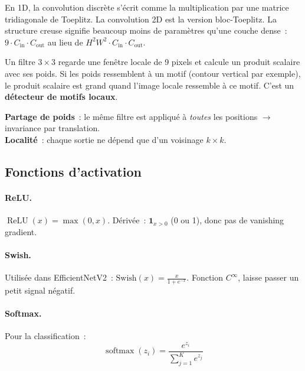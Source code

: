 \documentclass[11pt,a4paper]{article}
\DeclareMathOperator{\softmax}{softmax}
\DeclareMathOperator{\ReLU}{ReLU}
\begin{document}
\begin{rappelbox}
En 1D, la convolution discr\`ete s'\'ecrit comme la multiplication par une matrice tridiagonale de Toeplitz. La convolution 2D est la version bloc-Toeplitz. La structure creuse signifie beaucoup moins de param\`etres qu'une couche dense~: $9 \cdot C_{\text{in}} \cdot C_{\text{out}}$ au lieu de $H^2 W^2 \cdot C_{\text{in}} \cdot C_{\text{out}}$.
\end{rappelbox}

\begin{intubox}
Un filtre $3 \times 3$ regarde une fen\^etre locale de 9 pixels et calcule un produit scalaire avec ses poids. Si les poids ressemblent \`a un motif (contour vertical par exemple), le produit scalaire est grand quand l'image locale ressemble \`a ce motif. C'est un \textbf{d\'etecteur de motifs locaux}.

\textbf{Partage de poids}~: le m\^eme filtre est appliqu\'e \`a \emph{toutes} les positions $\to$ invariance par translation.\\
\textbf{Localit\'e}~: chaque sortie ne d\'epend que d'un voisinage $k \times k$.
\end{intubox}

\subsection{Fonctions d'activation}

\paragraph{ReLU.} $\ReLU(x) = \max(0, x)$. D\'eriv\'ee~: $\mathbf{1}_{x>0}$ (0 ou 1), donc pas de vanishing gradient.

\paragraph{Swish.} Utilis\'ee dans EfficientNetV2~: $\text{Swish}(x) = \frac{x}{1 + e^{-x}}$. Fonction $C^\infty$, laisse passer un petit signal n\'egatif.

\paragraph{Softmax.} Pour la classification~:
\begin{equation}
  \softmax(z_i) = \frac{e^{z_i}}{\sum_{j=1}^{K} e^{z_j}}
\end{equation}
\end{document}
